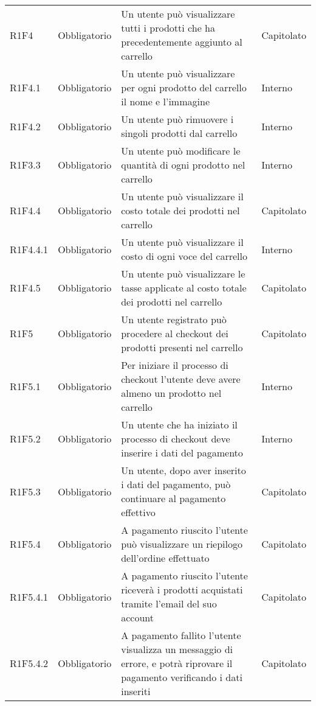 {\begin{longtable}{C{2.5cm} C{2.8cm} C{6.7cm} C{2.5cm}}
R1F4 & Obbligatorio & Un utente può visualizzare tutti i prodotti che ha precedentemente aggiunto al carrello & Capitolato \\
R1F4.1 & Obbligatorio & Un utente può visualizzare per ogni prodotto del carrello il nome e l’immagine & Interno \\
R1F4.2 & Obbligatorio & Un utente può rimuovere i singoli prodotti dal carrello & Interno \\
R1F3.3 & Obbligatorio & Un utente può modificare le quantità di ogni prodotto nel carrello & Interno \\
R1F4.4 & Obbligatorio & Un utente può visualizzare il costo totale dei prodotti nel carrello & Capitolato \\
R1F4.4.1 & Obbligatorio & Un utente può visualizzare il costo di ogni voce del carrello & Interno \\
R1F4.5 & Obbligatorio & Un utente può visualizzare le tasse applicate al costo totale dei prodotti nel carrello & Capitolato \\


R1F5 & Obbligatorio & Un utente registrato può procedere al checkout dei prodotti presenti nel carrello & Capitolato \\
R1F5.1 & Obbligatorio & Per iniziare il processo di checkout l’utente deve avere almeno un prodotto nel carrello & Interno \\
R1F5.2 & Obbligatorio & Un utente che ha iniziato il processo di checkout deve inserire i dati del pagamento & Interno \\
R1F5.3 & Obbligatorio & Un utente, dopo aver inserito i dati del pagamento, può continuare al pagamento effettivo & Capitolato \\
R1F5.4 & Obbligatorio & A pagamento riuscito l’utente può visualizzare un riepilogo dell’ordine effettuato & Capitolato \\
R1F5.4.1 & Obbligatorio & A pagamento riuscito l’utente riceverà i prodotti acquistati tramite l’email del suo account & Capitolato \\
R1F5.4.2 & Obbligatorio & A pagamento fallito l’utente visualizza un messaggio di errore, e potrà riprovare il pagamento verificando i dati inseriti & Capitolato \\



\end{longtable}}
